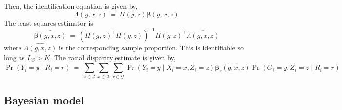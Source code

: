 \documentclass[11pt]{article}
\theoremstyle{plain}
\newcommand{\cZ}{\mathcal{Z}}
\newcommand{\cG}{\mathcal{G}}
\newcommand{\cX}{\mathcal{X}}
\newcommand{\bbeta}{\bm{\beta}}
\begin{document}
Then, the identification equation is given by,
\begin{equation}
  \Lambda(g,x,z) \ = \ \Pi(g,z) \bbeta(g,x,z)
\end{equation}
The least squares estimator is
\begin{equation}
  \widehat{\bbeta(g,x,z)} \ = \ \left(\Pi(g,z)^\top\Pi(g,z)\right)^{-1} \Pi(g,z)^\top \widehat{\Lambda(g,x,z)}
\end{equation}
where $\widehat{\Lambda(g,x,z)}$ is the corresponding sample
proportion. This is identifiable so long as $L_S > K$.  The racial
disparity estimate is given by,
\begin{equation}
  \Pr(Y_i = y \mid R_i = r) \ = \ \sum_{z \in \cZ} \sum_{x \in \cX}
  \sum_{g \in \cG} \Pr(Y_i = y \mid X_i = x, Z_i = z)
  \widehat{\bbeta_r(g,x,z)} \Pr(G_i = g, Z_i = z \mid R_i = r)
\end{equation}

\subsection{Bayesian model}
\end{document}
